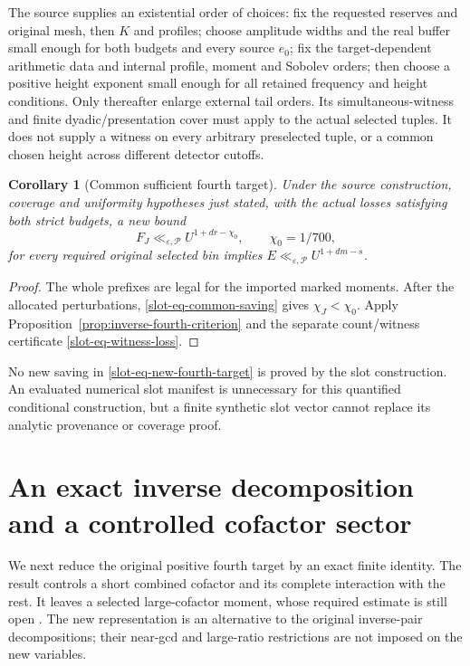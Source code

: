 \documentclass[11pt]{article}
\newtheorem{corollary}[theorem]{Corollary}
\theoremstyle{definition}
\newcommand{\eps}{\varepsilon}
\newcommand{\lls}{\ll_{\eps,\mathcal P}}
\begin{document}
The source supplies an existential order of choices: fix the requested
reserves and original mesh, then $K$ and profiles; choose amplitude
widths and the real buffer small enough for both budgets and every source
$e_0$; fix the target-dependent arithmetic data and internal profile,
moment and Sobolev orders; then choose a positive height exponent small
enough for all retained frequency and height conditions.  Only thereafter
enlarge external tail orders.  Its simultaneous-witness and finite
dyadic/presentation cover must apply to the actual selected tuples.
It does not supply a witness on every arbitrary preselected tuple,
or a common chosen height across different detector cutoffs.

\begin{corollary}[Common sufficient fourth target]
\label{slot-cor-common-target}
Under the source construction, coverage and uniformity hypotheses just
stated, with the actual losses satisfying both strict budgets, a new bound
\begin{equation}
 F_J\lls U^{1+dr-\chi_0},\qquad \chi_0=1/700,
 \label{slot-eq-new-fourth-target}
\end{equation}
for every required original selected bin implies $E\lls U^{1+dm-s}$.
\end{corollary}
\begin{proof}
The whole prefixes are legal for the imported marked moments.
After the allocated perturbations, \eqref{slot-eq-common-saving}
gives $\chi_J<\chi_0$.  Apply
Proposition~\ref{prop:inverse-fourth-criterion} and the separate
count/witness certificate \eqref{slot-eq-witness-loss}.
\end{proof}
No new saving in \eqref{slot-eq-new-fourth-target} is proved by the
slot construction.  An evaluated numerical slot manifest is unnecessary
for this quantified conditional construction, but a finite synthetic
slot vector cannot replace its analytic provenance or coverage proof.

\section{An exact inverse decomposition and a controlled cofactor sector}
\label{bil-sec-cofactor}

We next reduce the original positive fourth target by an exact finite
identity.  The result controls a short combined cofactor and its complete
interaction with the rest.  It leaves a selected large-cofactor moment,
whose required estimate is still open \cite{n22,n23}.
The new representation is an alternative to the original inverse-pair
decompositions; their near-gcd and large-ratio restrictions are not imposed
on the new variables.
\end{document}
